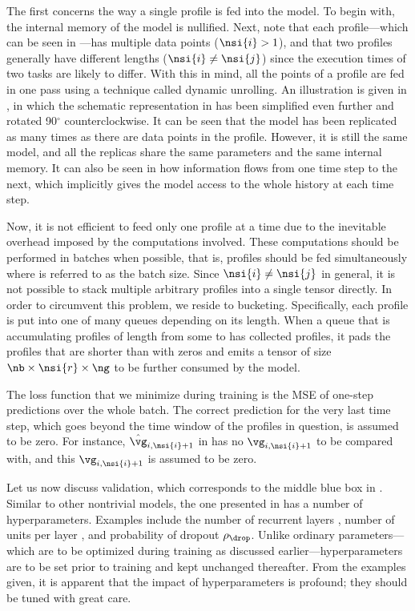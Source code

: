 The first concerns the way a single profile is fed into the model. To begin
with, the internal memory of the model is nullified. Next, note that each
profile---which can be seen in ---has multiple data points
($\nsi{i} > 1$), and that two profiles generally have different lengths
($\nsi{i} \neq \nsi{j}$) since the execution times of two tasks are likely to
differ. With this in mind, all the points of a profile are fed in one pass using
a technique called dynamic unrolling. An illustration is given in
, in which the schematic representation in 
has been simplified even further and rotated 90${}^\circ$ counterclockwise. It
can be seen that the model has been replicated as many times as there are data
points in the profile. However, it is still the same model, and all the replicas
share the same parameters and the same internal memory. It can also be seen in
 how information flows from one time step to the next, which
implicitly gives the model access to the whole history at each time step.

Now, it is not efficient to feed only one profile at a time due to the
inevitable overhead imposed by the computations involved. These computations
should be performed in batches when possible, that is, \nb profiles should be
fed simultaneously where \nb is referred to as the batch size. Since $\nsi{i}
\neq \nsi{j}$ in general, it is not possible to stack multiple arbitrary
profiles into a single tensor directly. In order to circumvent this problem, we
reside to bucketing. Specifically, each profile is put into one of many queues
depending on its length. When a queue that is accumulating profiles of length
from some  to  has collected \nb profiles, it pads the profiles
that are shorter than  with zeros and emits a tensor of size $\nb \times
\nsi{r} \times \ng$ to be further consumed by the model.

The loss function that we minimize during training is the \ac{MSE} of one-step
predictions over the whole batch. The correct prediction for the very last time
step, which goes beyond the time window of the profiles in question, is assumed
to be zero. For instance, $\hat{\vg}_{i, \nsi{i} + 1}$ in  has
no $\vg_{i, \nsi{i} + 1}$ to be compared with, and this $\vg_{i, \nsi{i} + 1}$
is assumed to be zero.

Let us now discuss validation, which corresponds to the middle blue box in
. Similar to other nontrivial models, the one presented in
 has a number of hyperparameters. Examples include the number
of recurrent layers \nl, number of units per layer \nu, and probability of
dropout $\rho_\drop$. Unlike ordinary parameters---which are to be optimized
during training as discussed earlier---hyperparameters are to be set prior to
training and kept unchanged thereafter. From the examples given, it is apparent
that the impact of hyperparameters is profound; they should be tuned with great
care.

